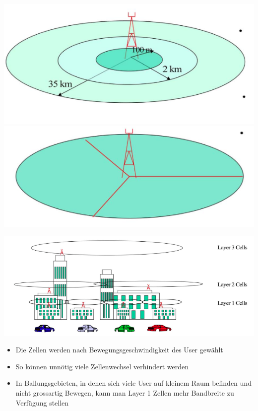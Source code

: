 \begin{minipage}{0.3 \linewidth}
\includegraphics[width = \linewidth]{./Pics/GSMZellen2}
\includegraphics[width = \linewidth]{./Pics/GSMZellen3}
\end{minipage}
\begin{minipage}{0.5 \linewidth}
\includegraphics[width = \linewidth]{./Pics/GSMZellenPrinzip}
\end{minipage}
\begin{minipage}{0.5 \linewidth}
\begin{itemize}
\item Die Zellen werden nach Bewegungsgeschwindigkeit des User gewählt
\item So können unnötig viele Zellenwechsel verhindert werden
\item In Ballungsgebieten, in denen sich viele User auf kleinem Raum befinden und nicht grossartig Bewegen, kann man Layer 1 Zellen mehr Bandbreite zu Verfügung stellen
\end{itemize}
\end{minipage}

